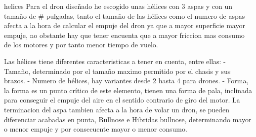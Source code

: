 
helices
                Para el dron diseñado he escogido unas hélices con 3 aspas y con un tamaño de # pulgadas, tanto el tamaño de las hélices como el numero de aspas afecta a la hora de calcular el empuje del dron ya que a mayor superficie mayor empuje, no obstante hay que tener encuenta que a mayor friccion mas consumo de los motores y por tanto menor tiempo de vuelo.
                
                Las hélices tiene diferentes caracteristicas a tener en cuenta, entre ellas:
                    - Tamaño, determinado por el tamaño maximo permitido por el chasis y sus brazos.
                    - Numero de hélices, hay variantes desde 2 hasta 4 para drones.
                    - Forma, la forma es un punto crítico de este elemento, tienen una forma de pala, inclinada para conseguir el empuje del aire en el sentido contrario de giro del motor. La terminacion del aspa tambien afecta a la hora de volar un dron, se pueden diferenciar acabadas en punta,  Bullnose e Hibridas bullnose, determinando mayor o menor empuje y por consecuente mayor o menor consumo.